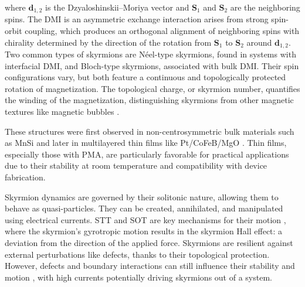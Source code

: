 \documentclass[conference]{IEEEtran}
\begin{document}
where $\bm{d}_{1,2}$ is the Dzyaloshinskii–Moriya vector and $\bm{S}_1$ and $\bm{S}_2$ are the neighboring spins. The DMI is an asymmetric exchange interaction arises from strong spin-orbit coupling, which produces an orthogonal alignment of neighboring spins with chirality determined by the direction of the rotation from $\bm{S}_1$ to $\bm{S}_2$ around $\bm{d}_{1,2}$. Two common types of skyrmions are Néel-type skyrmions, found in systems with interfacial DMI, and Bloch-type skyrmions, associated with bulk DMI. Their spin configurations vary, but both feature a continuous and topologically protected rotation of magnetization. The topological charge, or skyrmion number, quantifies the winding of the magnetization, distinguishing skyrmions from other magnetic textures like magnetic bubbles \cite{han_skyrmions_2017}.

These structures were first observed in non-centrosymmetric bulk materials such as MnSi \cite{muhlbauer_skyrmion_2009} and later in multilayered thin films like Pt/CoFeB/MgO \cite{woo_observation_2016}. Thin films, especially those with PMA, are particularly favorable for practical applications due to their stability at room temperature and compatibility with device fabrication.

Skyrmion dynamics are governed by their solitonic nature, allowing them to behave as quasi-particles. They can be created, annihilated, and manipulated using electrical currents. STT and SOT are key mechanisms for their motion \cite{fert_magnetic_2017}, where the skyrmion's gyrotropic motion results in the skyrmion Hall effect: a deviation from the direction of the applied force. Skyrmions are resilient against external perturbations like defects, thanks to their topological protection. However, defects and boundary interactions can still influence their stability and motion \cite{je_direct_2020}, with high currents potentially driving skyrmions out of a system.
\end{document}
